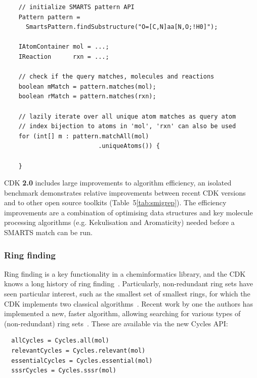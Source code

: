 \documentclass[10pt]{bmcart}
\def \cdkversion {\textbf{2.0}}
\begin{document}
  \begin{verbatim}
    // initialize SMARTS pattern API
    Pattern pattern = 
      SmartsPattern.findSubstructure("O=[C,N]aa[N,O;!H0]");

    IAtomContainer mol = ...;
    IReaction      rxn = ...;

    // check if the query matches, molecules and reactions
    boolean mMatch = pattern.matches(mol);
    boolean rMatch = pattern.matches(rxn);         

    // lazily iterate over all unique atom matches as query atom
    // index bijection to atoms in 'mol', 'rxn' can also be used
    for (int[] m : pattern.matchAll(mol)
                          .uniqueAtoms()) {

    }
  \end{verbatim}

  CDK \cdkversion{} includes large improvements to algorithm efficiency, an isolated benchmark demonstrates relative improvements between recent CDK versions and to other open source toolkits (Table~5\ref{tab:smigrep}). The efficiency improvements are a combination of optimising data structures and key molecule processing algorithms (e.g. Kekulisation and Aromaticity) needed before a SMARTS match can be run.
  


  \subsubsection*{Ring finding}

  Ring finding is a key functionality in a cheminformatics library, and the CDK
  knows a long history of ring finding~\cite{May2014}. Particularly, non-redundant
  ring sets have seen particular interest, such as the smallest set of smallest
  rings, for which the CDK implements two classical algorithms~\cite{Figueras1996,Berger2004}.
  Recent work by one the authors has implemented a new, faster algorithm, allowing
  searching for various types of (non-redundant) ring sets~\cite{May2014}. These
  are available via the new Cycles API:

\begin{verbatim}
  allCycles = Cycles.all(mol)
  relevantCycles = Cycles.relevant(mol)
  essentialCycles = Cycles.essential(mol)
  sssrCycles = Cycles.sssr(mol)
\end{verbatim}
\end{document}
